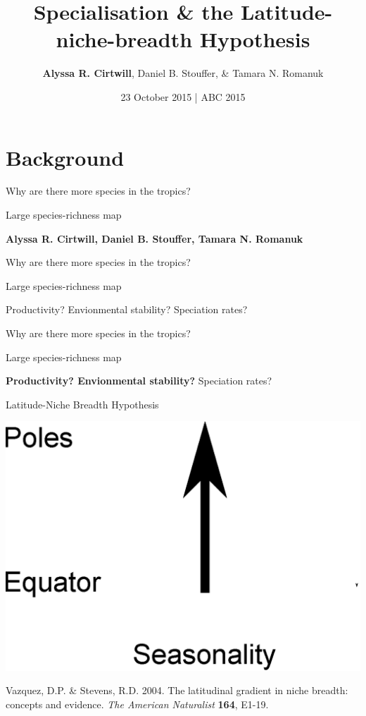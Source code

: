 \documentclass{beamer}
\title[Specialisation \& the Latitude-niche-breadth Hypothesis]
{Specialisation \& the Latitude-niche-breadth Hypothesis}
\author[A.R. Cirtwill, D.B. Stouffer, \& T.N. Romanuk]{\textbf{Alyssa R. Cirtwill}, Daniel B. Stouffer, \& Tamara N. Romanuk}
\institute[]
{
  Stouffer Lab\\
  School of Biological Sciences\\
  University of Canterbury\\
  Christchurch, New Zealand\\
  ~\\
  www.stoufferlab.org\\
}
\date[Short Occasion] 
{23 October 2015 | ABC 2015}
\begin{document}
\begin{frame}
  \titlepage
\end{frame}

\section*{Background}

  \begin{frame}{Why are there more species in the tropics?}

    \begin{center}
      Large species-richness map

    \textbf{Alyssa R. Cirtwill, Daniel B. Stouffer, Tamara N. Romanuk}

    \end{center}
  \end{frame}


  \begin{frame}{Why are there more species in the tropics?}

    \begin{center}
      Large species-richness map

    Productivity? Envionmental stability? Speciation rates?

    \end{center}
  \end{frame}


  \begin{frame}{Why are there more species in the tropics?}

    \begin{center}
      Large species-richness map

    \textbf{Productivity? Envionmental stability?} Speciation rates?

    \end{center}
  \end{frame}


  \begin{frame}{Latitude-Niche Breadth Hypothesis}

    \begin{center}
      \includegraphics[width=.8\textwidth]{Figures/latitude_niche_breadth_1.eps}
    \end{center}

    \footnotesize{Vazquez, D.P. \& Stevens, R.D. 2004. The latitudinal gradient in niche breadth: concepts and evidence. \emph{The American Naturalist} \textbf{164}, E1-19.}
  \end{frame}
\end{document}
